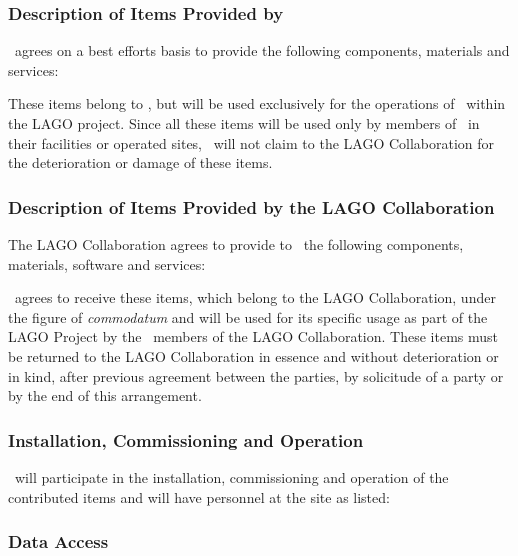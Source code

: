 \subsubsection{Description of Items Provided by \institution}

\institution~agrees on a best efforts basis to provide the following
components, materials and services:



These items belong to \institution, but will be used exclusively for the
operations of \institution~within the LAGO project. Since all these items will
be used only by members of \institution~in their facilities or operated sites,
\institution~will not claim to the LAGO Collaboration for the deterioration or
damage of these items.

\subsubsection{Description of Items Provided by the LAGO Collaboration}

The LAGO Collaboration agrees to provide to \institution~the following
components, materials, software and services:



\institution~agrees to receive these items, which belong to the LAGO
Collaboration, under the figure of {\it{commodatum}} and will be used for its
specific usage as part of the LAGO Project by the \institution~members of the
LAGO Collaboration. These items must be returned to the LAGO Collaboration in
essence and without deterioration or in kind, after previous agreement between
the parties, by solicitude of a party or by the end of this arrangement.

\subsubsection{Installation, Commissioning and Operation}

\institution\ will participate in the installation, commissioning and operation
of the contributed items and will have personnel at the site as listed:



\subsubsection{Data Access}

